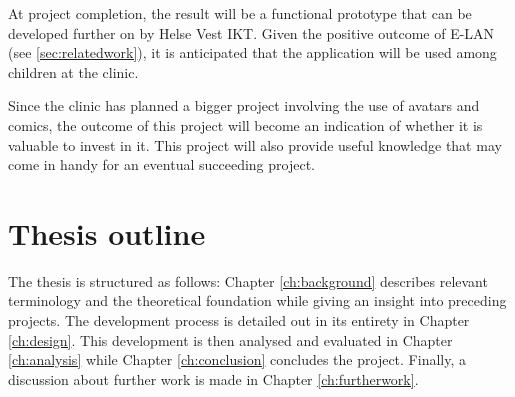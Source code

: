At project completion, the result will be a functional prototype that can be developed further on by Helse Vest IKT. Given the positive outcome of E-LAN (see \ref{sec:relatedwork}), it is anticipated that the application will be used among children at the clinic.

Since the clinic has planned a bigger project involving the use of avatars and comics, the outcome of this project will become an indication of whether it is valuable to invest in it. This project will also provide useful knowledge that may come in handy for an eventual succeeding project.

\section{Thesis outline}

The thesis is structured as follows: Chapter \ref{ch:background} describes relevant terminology and the theoretical foundation while giving an insight into preceding projects. The development process is detailed out in its entirety in Chapter \ref{ch:design}. This development is then analysed and evaluated in Chapter \ref{ch:analysis} while Chapter \ref{ch:conclusion} concludes the project. Finally, a discussion about further work is made in Chapter \ref{ch:furtherwork}.
